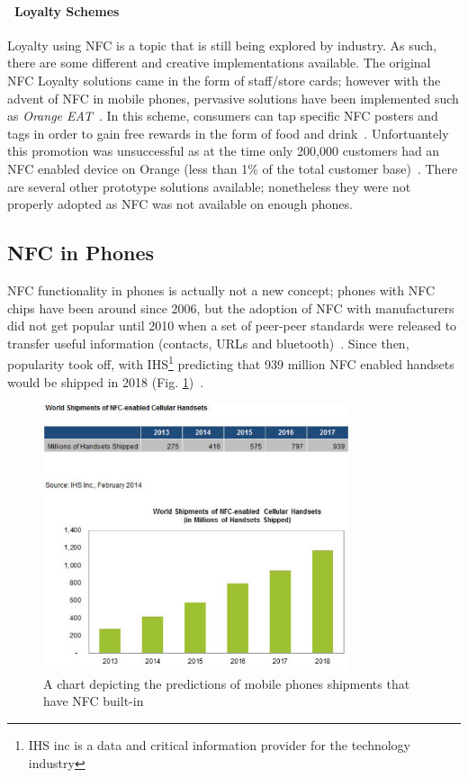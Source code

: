 \paragraph{\textbullet~Loyalty Schemes}
Loyalty using NFC is a topic that is still being explored by industry. As such, there are some different and creative implementations available. The original NFC Loyalty solutions came in the form of staff/store cards; however with the advent of NFC in mobile phones, pervasive solutions have been implemented such as \emph{Orange EAT}~\cite{orangeEat}.  In this scheme, consumers can tap specific NFC posters and tags in order to gain free rewards in the form of food and drink~\cite{orange}. Unfortuantely this promotion was unsuccessful as at the time only 200,000 customers had an NFC enabled device on Orange (less than 1\% of the total customer base)~\cite{orange}. There are several other prototype solutions available; nonetheless they were not properly adopted as NFC was not available on enough phones.
\clearpage{}
\subsection{NFC in Phones}
NFC functionality in phones is actually not a new concept; phones with NFC chips have been around since 2006, but the adoption of NFC with manufacturers did not get popular until 2010 when a set of peer-peer standards were released to transfer useful information (contacts, URLs and bluetooth)~\cite{iso18092}. Since then, popularity took off, with IHS\footnote{IHS inc is a data and critical information provider for the technology industry} predicting that 939 million NFC enabled handsets would be shipped in 2018 (Fig. \ref{fig:smartphoneshipments})~\cite{IHSchart}.
\begin{figure}[H]
  \centering
    \includegraphics[width=0.8\textwidth]{img/smartphoneNFC.png}
      \caption{A chart depicting the predictions of mobile phones shipments that have NFC built-in}
       \label{fig:smartphoneshipments}
\end{figure}

